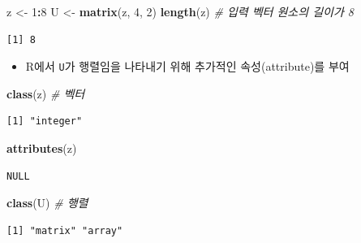 \documentclass[
  11pt,
]{krantz}
\newenvironment{Shaded}{\begin{snugshade}}{\end{snugshade}}
\newcommand{\CommentTok}[1]{\textcolor[rgb]{0.37,0.37,0.37}{\textit{#1}}}
\newcommand{\DecValTok}[1]{\textcolor[rgb]{0.06,0.06,0.06}{#1}}
\newcommand{\KeywordTok}[1]{\textcolor[rgb]{0.27,0.27,0.27}{\textbf{#1}}}
\newcommand{\NormalTok}[1]{#1}
\newcommand{\OperatorTok}[1]{\textcolor[rgb]{0.43,0.43,0.43}{\textbf{#1}}}
\newcommand{\StringTok}[1]{\textcolor[rgb]{0.5,0.5,0.5}{#1}}
\providecommand{\tightlist}{%
  \setlength{\itemsep}{0pt}\setlength{\parskip}{0pt}}
\begin{document}
\footnotesize

\begin{Shaded}
\begin{Highlighting}[]
\NormalTok{z <-}\StringTok{ }\DecValTok{1}\OperatorTok{:}\DecValTok{8}
\NormalTok{U <-}\StringTok{ }\KeywordTok{matrix}\NormalTok{(z, }\DecValTok{4}\NormalTok{, }\DecValTok{2}\NormalTok{)}
\KeywordTok{length}\NormalTok{(z) }\CommentTok{# 입력 벡터 원소의 길이가 8}
\end{Highlighting}
\end{Shaded}

\begin{verbatim}
[1] 8
\end{verbatim}

\normalsize

\begin{itemize}
\tightlist
\item
  R에서 \texttt{U}가 행렬임을 나타내기 위해 추가적인 속성(attribute)를 부여
\end{itemize}

\footnotesize

\begin{Shaded}
\begin{Highlighting}[]
\KeywordTok{class}\NormalTok{(z) }\CommentTok{# 벡터}
\end{Highlighting}
\end{Shaded}

\begin{verbatim}
[1] "integer"
\end{verbatim}

\begin{Shaded}
\begin{Highlighting}[]
\KeywordTok{attributes}\NormalTok{(z)}
\end{Highlighting}
\end{Shaded}

\begin{verbatim}
NULL
\end{verbatim}

\begin{Shaded}
\begin{Highlighting}[]
\KeywordTok{class}\NormalTok{(U) }\CommentTok{# 행렬}
\end{Highlighting}
\end{Shaded}

\begin{verbatim}
[1] "matrix" "array" 
\end{verbatim}
\end{document}
